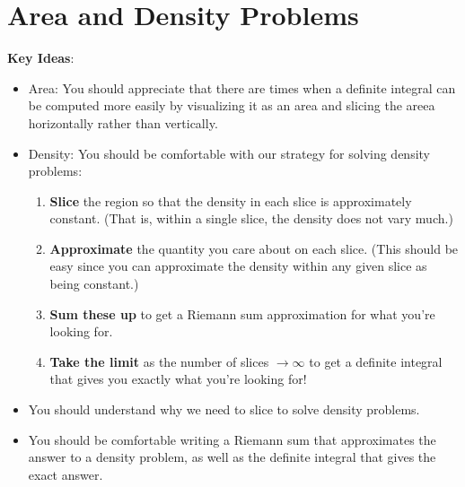 \documentclass[main]{subfiles}
\begin{document}
\ifSubfilesClassLoaded{%
  \chaptermark{\chaptersix}
}{}

\section{Area and Density Problems} \label{ws6-6}

\begin{problemonly}
    \begin{framed}

\textbf{Key Ideas}:

\begin{itemize}[topsep=0pt,partopsep=0pt,parsep=8pt,itemsep=0pt]


\item Area: 
  You should appreciate that there are times when a definite
  integral can be computed more easily by visualizing it as an area
  and slicing the areea horizontally rather than vertically.

\item Density: You should be comfortable with our strategy for     
  solving density problems:
  \begin{enumerate}[topsep=0pt,nosep]
  \item \textbf{Slice} the region so that the density in each slice is
    approximately constant.   (That is, within a single slice, the density
    does not vary much.) 
  \item \textbf{Approximate} the quantity you care about on each slice.
    (This should be easy since you can approximate the density within any
    given slice as being constant.) 
  \item \textbf{Sum these up} to get a Riemann sum approximation for what
    you're looking for.
  \item \textbf{Take the limit} as the number of slices $\to \infty$ to
    get a definite integral that gives you exactly what you're looking
    for! 
  \end{enumerate}

\item You should understand why we need to slice to solve density
  problems.  

\item You should be comfortable writing a Riemann sum that approximates
  the answer to a density problem, as well as the definite integral that
  gives the exact answer.


\end{itemize}
\end{framed}
\end{problemonly}
\end{document}
